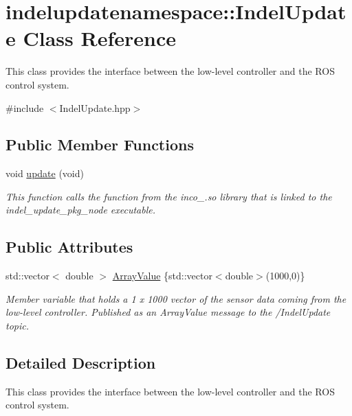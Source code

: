 \hypertarget{classindelupdatenamespace_1_1IndelUpdate}{}\section{indelupdatenamespace\+:\+:Indel\+Update Class Reference}
\label{classindelupdatenamespace_1_1IndelUpdate}


This class provides the interface between the low-\/level controller and the R\+OS control system.  




{\ttfamily \#include $<$Indel\+Update.\+hpp$>$}

\subsection*{Public Member Functions}
\begin{DoxyCompactItemize}
\item 
void \hyperlink{classindelupdatenamespace_1_1IndelUpdate_a090a97f692782ed532921bf2eeab8ae4}{update} (void)
\begin{DoxyCompactList}\small\item\em This function calls the function from the inco\+\_.\+so library that is linked to the indel\+\_\+update\+\_\+pkg\+\_\+node executable. \end{DoxyCompactList}\end{DoxyCompactItemize}
\subsection*{Public Attributes}
\begin{DoxyCompactItemize}
\item 
std\+::vector$<$ double $>$ \hyperlink{classindelupdatenamespace_1_1IndelUpdate_adb07f7b8d3c6aa7bde3e1d9c78aeb0d9}{Array\+Value} \{std\+::vector$<$double$>$(1000,0)\}
\begin{DoxyCompactList}\small\item\em Member variable that holds a 1 x 1000 vector of the sensor data coming from the low-\/level controller. Published as an Array\+Value message to the /\+Indel\+Update topic. \end{DoxyCompactList}\end{DoxyCompactItemize}


\subsection{Detailed Description}
This class provides the interface between the low-\/level controller and the R\+OS control system. 

